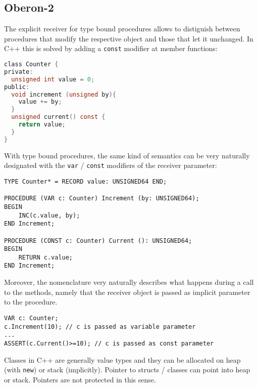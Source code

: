 \documentclass[a4wide,11pt]{article}
\begin{document}
\begin{annotation}
\subsection{Oberon-2}

The explicit receiver for type bound procedures allows to distiguish between procedures that modify the respective object and those that let it unchanged. In C++ this is solved by adding a \lstinline"const" modifier at member functions:
\begin{lstlisting}[style=example,language=C]
class Counter {
private:
  unsigned int value = 0;
public:
  void increment (unsigned by){
    value += by;	
  }
  unsigned current() const {
    return value;	
  }
}
\end{lstlisting}

With type bound procedures, the same kind of semantics can be very naturally designated with the \lstinline"var" / \lstinline"const" modifiers of the receiver parameter:
\begin{lstlisting}[style=example]
TYPE Counter* = RECORD value: UNSIGNED64 END;

PROCEDURE (VAR c: Counter) Increment (by: UNSIGNED64);
BEGIN
	INC(c.value, by);
END Increment;

PROCEDURE (CONST c: Counter) Current (): UNSIGNED64;
BEGIN
	RETURN c.value;
END Increment;

\end{lstlisting}

Moreover, the nomenclature very naturally describes what happens during a call to the methods, namely that the receiver object is passed as implicit parameter to the procedure.
\begin{lstlisting}[style=example]
VAR c: Counter;
c.Increment(10); // c is passed as variable parameter
...
ASSERT(c.Current()>=10); // c is passed as const parameter
\end{lstlisting}

Classes in C++ are generally value types and they can be allocated on heap (with \lstinline"new") or stack (implicitly). 
Pointer to structs / classes can point into heap or stack.
Pointers are not protected in this sense. 


\end{annotation}
\end{document}
